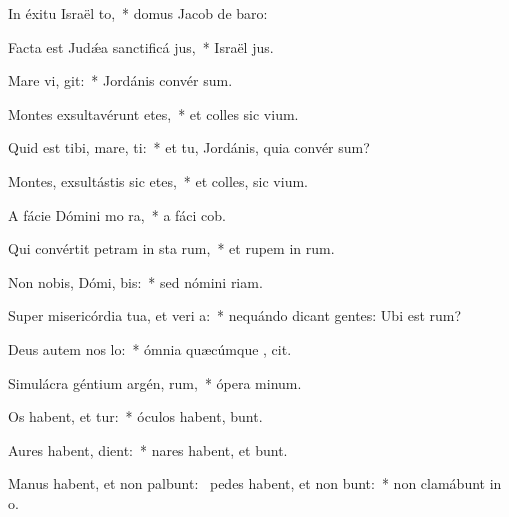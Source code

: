 \item In éxitu Israël  to,~* domus Jacob de  baro:
\item Facta est Judǽa sanctificá jus,~* Israël  jus.
\item Mare vi,  git:~* Jordánis convér  sum.
\item Montes exsultavérunt  etes,~* et colles sic  vium.
\item Quid est tibi, mare,  ti:~* et tu, Jordánis, quia convér  sum?
\item Montes, exsultástis sic etes,~* et colles, sic  vium.
\item A fácie Dómini mo  ra,~* a fáci  cob.
\item Qui convértit petram in sta rum,~* et rupem in  rum.
\item Non nobis, Dómi,  bis:~* sed nómini   riam.
\item Super misericórdia tua, et veri a:~* nequándo dicant gentes: Ubi est  rum?
\item Deus autem nos  lo:~* ómnia quæcúmque , cit.
\item Simulácra géntium argén,  rum,~* ópera  minum.
\item Os habent, et  tur:~* óculos habent,   bunt.
\item Aures habent,   dient:~* nares habent, et  bunt.
\item Manus habent, et non palbunt:~\pscross{} pedes habent, et non bunt:~* non clamábunt in  o.
